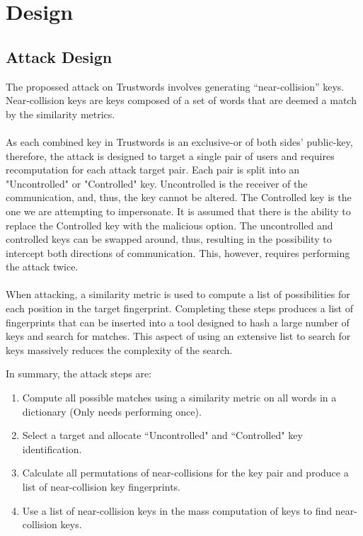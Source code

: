 \section{Design}

\subsection{Attack Design}
\label{sec:attackDesign}
The propossed attack on Trustwords involves generating ``near-collision'' keys. Near-collision keys are keys composed of a set of words that are deemed a match by the similarity metrics.
\\\\
As each combined key in Trustwords is an exclusive-or of both sides' public-key, therefore, the attack is designed to target a single pair of users and requires recomputation for each attack target pair. Each pair is split into an "Uncontrolled" or "Controlled" key. Uncontrolled is the receiver of the communication, and, thus, the key cannot be altered. The Controlled key is the one we are attempting to impersonate. It is assumed that there is the ability to replace the Controlled key with the malicious option. The uncontrolled and controlled keys can be swapped around, thus, resulting in the possibility to intercept both directions of communication. This, however, requires performing the attack twice.
\\\\
When attacking, a similarity metric is used to compute a list of possibilities for each position in the target fingerprint. Completing these steps produces a list of fingerprints that can be inserted into a tool designed to hash a large number of keys and search for matches. This aspect of using an extensive list to search for keys massively reduces the complexity of the search.

In summary, the attack steps are:
\begin{enumerate}
    \item Compute all possible matches using a similarity metric on all words in a dictionary (Only needs performing once).

    \item Select a target and allocate ``Uncontrolled" and ``Controlled" key identification.
    
    \item Calculate all permutations of near-collisions for the key pair and produce a list of near-collision key fingerprints.
    
    \item Use a list of near-collision keys in the mass computation of keys to find near-collision keys.

\end{enumerate}

